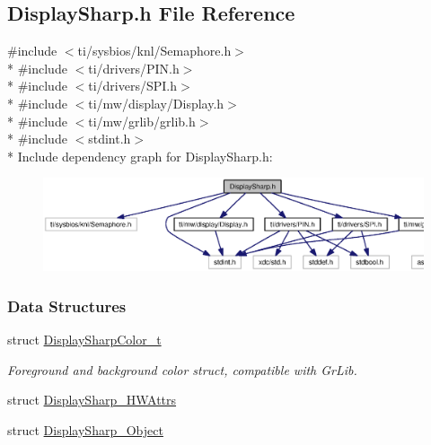 \subsection{Display\+Sharp.\+h File Reference}
\label{_display_sharp_8h}
{\ttfamily \#include $<$ti/sysbios/knl/\+Semaphore.\+h$>$}\\*
{\ttfamily \#include $<$ti/drivers/\+P\+I\+N.\+h$>$}\\*
{\ttfamily \#include $<$ti/drivers/\+S\+P\+I.\+h$>$}\\*
{\ttfamily \#include $<$ti/mw/display/\+Display.\+h$>$}\\*
{\ttfamily \#include $<$ti/mw/grlib/grlib.\+h$>$}\\*
{\ttfamily \#include $<$stdint.\+h$>$}\\*
Include dependency graph for Display\+Sharp.\+h\+:
\nopagebreak
\begin{figure}[H]
\begin{center}
\leavevmode
\includegraphics[width=350pt]{_display_sharp_8h__incl}
\end{center}
\end{figure}
\subsubsection*{Data Structures}
\begin{DoxyCompactItemize}
\item 
struct \hyperlink{struct_display_sharp_color__t}{Display\+Sharp\+Color\+\_\+t}
\begin{DoxyCompactList}\small\item\em Foreground and background color struct, compatible with Gr\+Lib. \end{DoxyCompactList}\item 
struct \hyperlink{struct_display_sharp___h_w_attrs}{Display\+Sharp\+\_\+\+H\+W\+Attrs}
\item 
struct \hyperlink{struct_display_sharp___object}{Display\+Sharp\+\_\+\+Object}
\end{DoxyCompactItemize}
